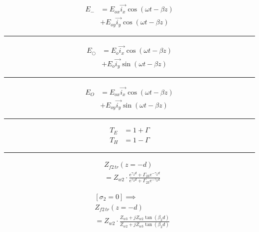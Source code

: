 \documentclass[12pt]{article}
\newcommand{\grayrule}{{\color{lightgray} \hrule}}
\begin{document}
\begin{multicols}{3}
\begin{equation*}
    \begin{split}
        E_{-} &= E_{ox} \Vec{i_x} \cos(\omega t - \beta z) \\
              &+ E_{oy} \Vec{i_y} \cos(\omega t - \beta z)
    \end{split}
\end{equation*}
\grayrule
\begin{equation*}
    \begin{split}
        E_{\bigcirc} &= E_{o} \Vec{i_x} \cos(\omega t - \beta z) \\
                     &+ E_{o} \Vec{i_y} \sin(\omega t - \beta z)
    \end{split}
\end{equation*}
\grayrule
\begin{equation*}
    \begin{split}
        E_{O} &= E_{ox} \Vec{i_x} \cos(\omega t - \beta z) \\
              &+ E_{oy} \Vec{i_y} \sin(\omega t - \beta z)
    \end{split}
\end{equation*}

\grayrule

\begin{equation*}
    \begin{split}
        T_E &= 1 + \Gamma \\
        T_H &= 1 - \Gamma
    \end{split}
\end{equation*}

\grayrule
\begin{equation*}
    \begin{split}
        &Z_{f2 \, tr}(z = -d) \\
        &= Z_{w2} \cdot \frac{e^{\gamma_2 d} + \Gamma_{23} e^{-\gamma_2 d}}{e^{\gamma_2 d} + \Gamma_{23} e^{-\gamma_2 d}}
    \end{split}
\end{equation*}

\begin{equation*}
    \begin{split}
        &[\sigma_2 = 0] \implies \\
        &Z_{f2 \, tr}(z = -d) \\
        &= Z_{w2} \cdot \frac{Z_{w3} + j Z_{w2} \tan(\beta_2 d)}{Z_{w2} + j Z_{w3} \tan(\beta_2 d)}
    \end{split}
\end{equation*}


\end{multicols}
\end{document}
